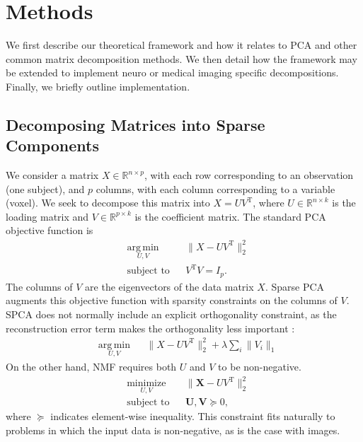 \documentclass{elsarticle}\usepackage{graphicx, color}
\newcommand{\transpose}{^\mathrm{T}}
\begin{document}
\section{Methods}
We first describe our theoretical framework and how it relates to PCA
and other common matrix decomposition methods.  We then detail how the
framework may be extended to implement neuro or medical imaging
specific decompositions.  Finally, we briefly outline implementation.

\subsection{Decomposing Matrices into Sparse Components}
We consider a matrix $X \in \mathbb{R}^{n \times p}$, with each row corresponding to an observation (one subject), and $p$ columns, with each column corresponding to a variable (voxel). We seek to decompose this matrix into $X = UV^{\mathrm{T}}$, where $U \in \mathbb{R}^{n \times k}$ is the loading matrix and $V \in \mathbb{R}^{p \times k}$ is the coefficient matrix.  The standard PCA objective function is 
\begin{equation}
\begin{aligned}
&\underset{U,V}{\operatorname{arg\,min}} & & \| X - UV^{\mathrm{T}} \|_2^2 \\
&\text{subject to} & &V^{\mathrm{T}} V = I_p.
\end{aligned}
\end{equation}
The columns of $V$ are the eigenvectors of the data matrix $X$.  Sparse PCA augments this objective function with sparsity constraints on the columns of $V$.  SPCA does not normally include an explicit orthogonality constraint, as the reconstruction error term makes the orthogonality less important \cite{le_ica_2011}:
\begin{equation}
\begin{aligned}
&\underset{U,V}{\operatorname{arg\,min}} & & \| X - UV\transpose \|_2^2 + \lambda \sum_i \|V_i\|_1
\end{aligned}
\end{equation}
On the other hand, NMF requires both $U$ and $V$ to be non-negative.  
\begin{equation}
\begin{aligned}
&\underset{U, V}{\text{minimize}} &&\| \mathbf{X} - UV\transpose\|_2^2 \\ 
& \text{subject to} & &\mathbf{U,V} \succeq 0,
\end{aligned}
\end{equation}
where $\succeq$ indicates element-wise inequality. This constraint fits naturally to problems in which the input data is non-negative, as is the case with images.  
\end{document}
